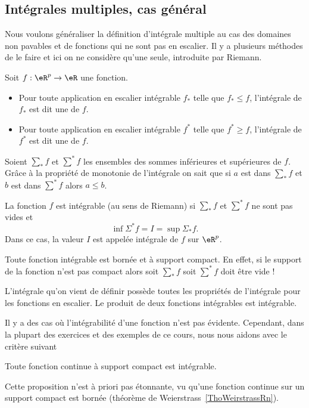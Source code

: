 \subsection{Intégrales multiples, cas général}

Nous voulons généraliser la définition d'intégrale multiple au cas des domaines non pavables et de fonctions qui ne sont pas en escalier. Il y a plusieurs méthodes de le faire et ici on ne considère qu'une seule, introduite par Riemann.
\begin{definition} Soit \( f: \eR^p\to \eR\) une fonction.
	\begin{itemize}
		\item Pour toute application en escalier intégrable \( f_*\) telle que \( f_*\leq f\), l'intégrale de \( f_*\) est dit une  de \( f\).
		\item Pour toute application en escalier intégrable \( f^*\) telle que \( f^*\geq f\), l'intégrale de \( f^*\) est dit une  de \( f\).
	\end{itemize}
\end{definition}
Soient \( \sum_* f\) et  \( \sum^* f\) les ensembles des sommes inférieures et supérieures de \( f\). Grâce à la propriété de  monotonie de l'intégrale on sait que si \( a\) est dans \( \sum_* f\) et  \( b\) est dans \( \sum^* f\) alors \( a\leq b\).
\begin{definition}
	La fonction \( f\) est intégrable (au sens de Riemann) si \( \sum_* f\) et  \( \sum^* f\) ne sont pas vides et
	\[
		\inf \Sigma^* f=I =\sup \Sigma_* f.
	\]
	Dans ce cas, la valeur \( I\) est appelée intégrale de \( f\) sur \( \eR^p\).
\end{definition}
\begin{remark}
	Toute fonction intégrable est bornée et à support compact. En effet, si le support de la  fonction n'est pas compact alors soit \( \sum_* f\) soit \( \sum^* f\) doit être vide !
\end{remark}
L'intégrale qu'on vient de définir possède toutes les propriétés de l'intégrale pour les fonctions en escalier. Le produit de deux fonctions intégrables est intégrable.

Il y a des cas où l'intégrabilité d'une fonction n'est pas évidente. Cependant, dans la plupart des exercices et des exemples de ce cours, nous nous aidons avec le critère suivant
\begin{proposition}
	Toute fonction continue à support compact est intégrable.
\end{proposition}
Cette proposition n'est à priori pas étonnante, vu qu'une fonction continue sur un support compact est bornée (théorème de Weierstrass~\ref{ThoWeirstrassRn}).

